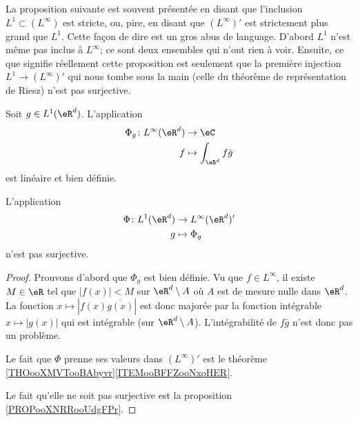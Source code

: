 La proposition suivante est souvent présentée en disant que l'inclusion \( L^1\subset (L^{\infty})\) est stricte, ou, pire, en disant que \( (L^{\infty})'\) est strictement plus grand que \( L^1\). Cette façon de dire est un gros abus de language. D'abord \( L^1\) n'est même pas inclus à \( L^{\infty}\); ce sont deux ensembles qui n'ont rien à voir. Ensuite, ce que signifie réellement cette proposition est seulement que la première injection \( L^1\to (L^{\infty})'\) qui nous tombe sous la main (celle du théorème de représentation de Riesz) n'est pas surjective.
\begin{proposition}     \label{PROPooXXRQooNSBZOi}
	Soit \( g\in L^1(\eR^d)\). L'application
	\begin{equation}
		\begin{aligned}
			\Phi_g\colon L^{\infty}(\eR^d) & \to \eC                     \\
			f                              & \mapsto \int_{\eR^d}f\bar g
		\end{aligned}
	\end{equation}
	est linéaire et bien définie.

	L'application
	\begin{equation}
		\begin{aligned}
			\Phi\colon L^1(\eR^d) & \to L^{\infty}(\eR^d)' \\
			g                     & \mapsto \Phi_g
		\end{aligned}
	\end{equation}
	n'est pas surjective.
\end{proposition}

\begin{proof}
	Prouvons d'abord que \( \Phi_g\) est bien définie. Vu que \( f\in L^{\infty}\), il existe \( M\in \eR\) tel que \( | f(x) |<M\) sur \( \eR^d\setminus A\) où \( A\) est de mesure nulle dans \( \eR^d\). La fonction \( x\mapsto| f(x)\overline{ g(x) } |\) est donc majorée par la fonction intégrable \( x\mapsto | g(x) |\) qui est intégrable (sur \( \eR^d\setminus A\)). L'intégrabilité de \( f\bar g\) n'est donc pas un problème.

	Le fait que \( \Phi\) prenne ses valeurs dans \( (L^{\infty})'\) est le théorème \ref{THOooXMVTooBAbyvr}\ref{ITEMooBFFZooNxoHER}.

	Le fait qu'elle ne soit pas surjective est la proposition \ref{PROPooXNRRooUdgFPr}.
\end{proof}
